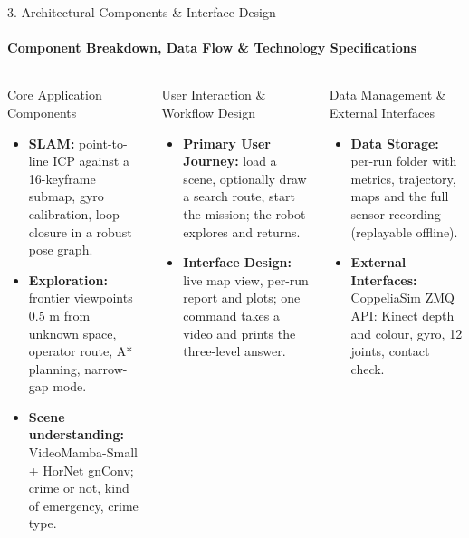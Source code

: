 \documentclass[aspectratio=169, 11pt]{beamer}
\begin{document}
\begin{frame}{3. Architectural Components \& Interface Design}
    \framesubtitle{Component Breakdown, Data Flow \& Technology Specifications}
    \begin{columns}[T]
        \begin{block}{Core Application Components}
            \scriptsize
            \begin{itemize}
                \item \textbf{SLAM:} point-to-line ICP against a 16-keyframe submap, gyro calibration, loop closure in a robust pose graph.
                \item \textbf{Exploration:} frontier viewpoints 0.5 m from unknown space, operator route, A* planning, narrow-gap mode.
                \item \textbf{Scene understanding:} VideoMamba-Small + HorNet gnConv; crime or not, kind of emergency, crime type.
            \end{itemize}
        \end{block}

        \begin{block}{User Interaction \& Workflow Design}
            \scriptsize
            \begin{itemize}
                \item \textbf{Primary User Journey:} load a scene, optionally draw a search route, start the mission; the robot explores and returns.
                \item \textbf{Interface Design:} live map view, per-run report and plots; one command takes a video and prints the three-level answer.
            \end{itemize}
        \end{block}

        \begin{block}{Data Management \& External Interfaces}
            \scriptsize
            \begin{itemize}
                \item \textbf{Data Storage:} per-run folder with metrics, trajectory, maps and the full sensor recording (replayable offline).
                \item \textbf{External Interfaces:} CoppeliaSim ZMQ API: Kinect depth and colour, gyro, 12 joints, contact check.
            \end{itemize}
        \end{block}


\end{columns}
\end{frame}
\end{document}
